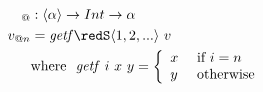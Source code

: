 \documentclass[preview]{standalone}
\begin{document}
\begin{align*}
  _{@} &: \vect{\alpha} \rightarrow Int \rightarrow \alpha \\
  v_{@n} & = \mathit{getf} \redS \vect{1,2,...}\ v\\
         & \text{where}\ \ \mathit{getf}\ i\ x\ y = 
           \left\{\begin{array}{ll}
                    x & \text{ if } i = n\\
                    y & \text{ otherwise}
                  \end{array}
           \right.\\
\end{align*}
\end{document}
